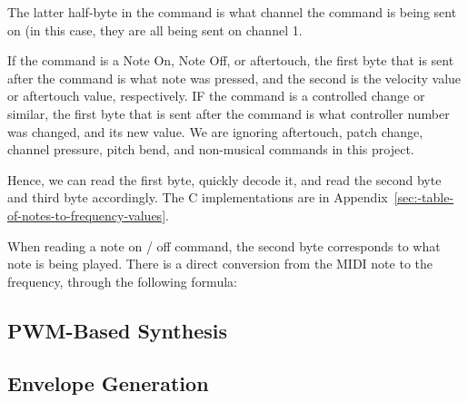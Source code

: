 The latter half-byte in the command is what channel the command is being sent on (in this case, they are all being sent on channel 1. 

If the command is a Note On, Note Off, or aftertouch, the first byte that is sent after the command is what note was pressed, and the second is the velocity value or aftertouch value, respectively. IF the command is a controlled change or similar, the first byte that is sent after the command is what controller number was changed, and its new value. We are ignoring aftertouch, patch change, channel pressure, pitch bend, and non-musical commands in this project. 

Hence, we can read the first byte, quickly decode it, and read the second byte and third byte accordingly.
The C implementations are in Appendix~\ref{sec:-table-of-notes-to-frequency-values}.

When reading a note on / off command, the second byte corresponds to what note is being played.
There is a direct conversion from the MIDI note to the frequency, through the following formula:




\subsection{PWM-Based Synthesis}\label{subsec:pwm-based-synthesis-theory}

\subsection{Envelope Generation}\label{subsec:envelope-generation-theory}